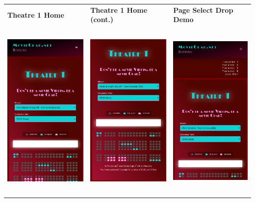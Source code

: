 \documentclass[11pt, english]{article}
\begin{document}
	\begin{center}
        	\scriptsize
        \begin{longtable}{p{5cm}p{5cm}p{5cm}}
		\textbf{Theatre 1 Home} & \textbf{Theatre 1 Home (cont.)} & \textbf{Page Select Drop Demo}\\
		\includegraphics[width=5cm,height=9cm]{CS993_IMG/booker1.png} & \includegraphics[width=5cm,height=9cm]{CS993_IMG/booker3.png} & \includegraphics[width=5cm,height=9cm]{CS993_IMG/booker2.png}\\

\end{longtable}
\end{center}
\end{document}
